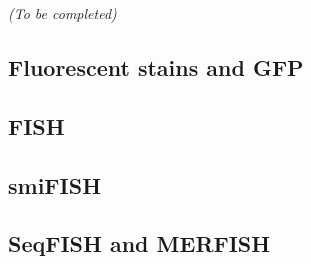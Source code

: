 \begin{center}
	\textit{(To be completed)}
\end{center}



\subsection{Fluorescent stains and GFP}
\label{subsec:intro_fluorescence}

\subsection{FISH}
\label{subsec:intro_fish}

\subsection{smiFISH}
\label{subsec:intro_smifish}

\subsection{SeqFISH and MERFISH}
\label{subsec:intro_multiplexing}


